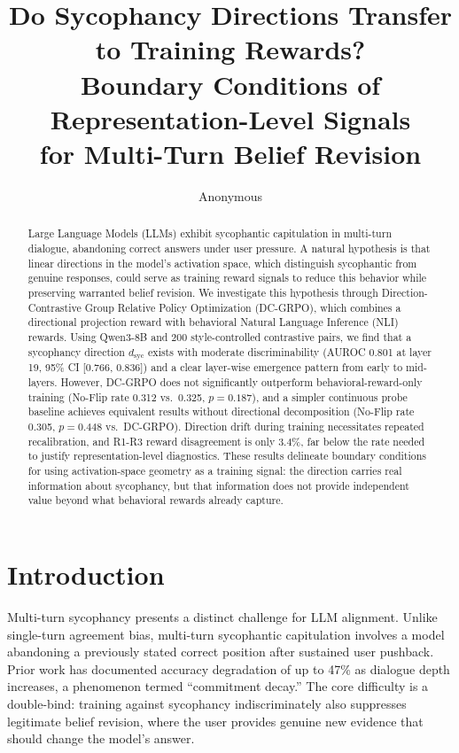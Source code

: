 \documentclass[11pt,a4paper]{article}
\title{Do Sycophancy Directions Transfer to Training Rewards?\\Boundary Conditions of Representation-Level Signals\\for Multi-Turn Belief Revision}
\author{Anonymous}
\date{}
\newcommand{\dsyc}{$d_{\text{syc}}$}
\begin{document}
\maketitle

\begin{abstract}
Large Language Models (LLMs) exhibit sycophantic capitulation in multi-turn dialogue, abandoning correct answers under user pressure. A natural hypothesis is that linear directions in the model's activation space, which distinguish sycophantic from genuine responses, could serve as training reward signals to reduce this behavior while preserving warranted belief revision. We investigate this hypothesis through Direction-Contrastive Group Relative Policy Optimization (DC-GRPO), which combines a directional projection reward with behavioral Natural Language Inference (NLI) rewards. Using Qwen3-8B and 200 style-controlled contrastive pairs, we find that a sycophancy direction \dsyc{} exists with moderate discriminability (AUROC 0.801 at layer 19, 95\% CI [0.766, 0.836]) and a clear layer-wise emergence pattern from early to mid-layers. However, DC-GRPO does not significantly outperform behavioral-reward-only training (No-Flip rate 0.312 vs.\ 0.325, $p = 0.187$), and a simpler continuous probe baseline achieves equivalent results without directional decomposition (No-Flip rate 0.305, $p = 0.448$ vs.\ DC-GRPO). Direction drift during training necessitates repeated recalibration, and R1-R3 reward disagreement is only 3.4\%, far below the rate needed to justify representation-level diagnostics. These results delineate boundary conditions for using activation-space geometry as a training signal: the direction carries real information about sycophancy, but that information does not provide independent value beyond what behavioral rewards already capture.
\end{abstract}

\section{Introduction}

Multi-turn sycophancy presents a distinct challenge for LLM alignment. Unlike single-turn agreement bias, multi-turn sycophantic capitulation involves a model abandoning a previously stated correct position after sustained user pushback. Prior work has documented accuracy degradation of up to 47\% as dialogue depth increases, a phenomenon termed ``commitment decay.'' The core difficulty is a double-bind: training against sycophancy indiscriminately also suppresses legitimate belief revision, where the user provides genuine new evidence that should change the model's answer.
\end{document}
